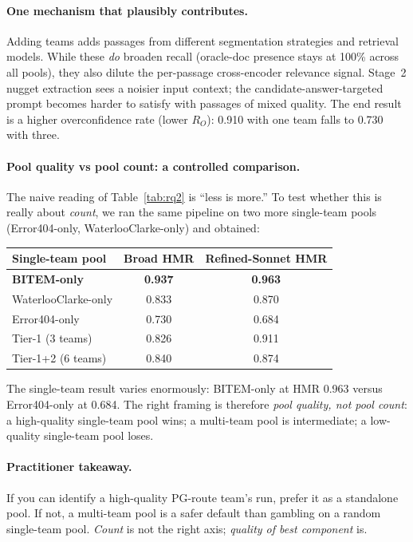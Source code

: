 \documentclass[11pt,a4paper]{article}
\newcommand{\HMR}{\textsc{HMR}}
\begin{document}
\paragraph{One mechanism that plausibly contributes.} Adding teams adds passages from
different segmentation strategies and retrieval models. While these
\emph{do} broaden recall (oracle-doc presence stays at 100\%
across all pools), they also dilute the per-passage cross-encoder
relevance signal. Stage~2 nugget extraction sees a noisier input
context; the candidate-answer-targeted prompt becomes harder to
satisfy with passages of mixed quality. The end result is a higher
overconfidence rate (lower $R_O$): 0.910 with one team falls to 0.730
with three.

\paragraph{Pool quality vs pool count: a controlled comparison.}
The naive reading of Table~\ref{tab:rq2} is ``less is more.'' To test
whether this is really about \emph{count}, we ran the same pipeline
on two more single-team pools (Error404-only, WaterlooClarke-only)
and obtained:

\begin{center}
\begin{tabular}{lcc}
\toprule
Single-team pool & Broad \HMR & Refined-Sonnet \HMR \\
\midrule
\textbf{BITEM-only}            & \textbf{0.937} & \textbf{0.963} \\
WaterlooClarke-only            & 0.833          & 0.870 \\
Error404-only                  & 0.730          & 0.684 \\
\midrule
Tier-1 (3 teams)               & 0.826          & 0.911 \\
Tier-1+2 (6 teams)             & 0.840          & 0.874 \\
\bottomrule
\end{tabular}
\end{center}

\noindent The single-team result varies enormously: BITEM-only at
\HMR{} 0.963 versus Error404-only at 0.684. The right framing is
therefore \emph{pool quality, not pool count}: a high-quality
single-team pool wins; a multi-team pool is intermediate; a
low-quality single-team pool loses.

\paragraph{Practitioner takeaway.} If you can identify a high-quality
PG-route team's run, prefer it as a standalone pool. If not, a
multi-team pool is a safer default than gambling on a random
single-team pool. \emph{Count} is not the right axis; \emph{quality
of best component} is.
\end{document}

